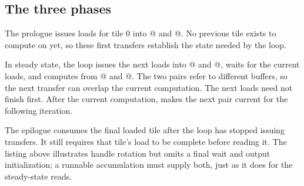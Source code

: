 \subsection*{The three phases}

The prologue issues loads for tile 0 into @ and @. No previous tile exists to compute on yet, so these first transfers establish the state needed by the loop.

In steady state, the loop issues the next loads into @ and @, waits for the current loads, and computes from @ and @. The two pairs refer to different buffers, so the next transfer can overlap the current computation. The next loads need not finish first. After the current computation, \co@swap@ makes the next pair current for the following iteration.

The epilogue consumes the final loaded tile after the loop has stopped issuing transfers. It still requires that tile's load to be complete before reading it. The listing above illustrates handle rotation but omits a final wait and output initialization; a runnable accumulation must supply both, just as it does for the steady-state reads.
